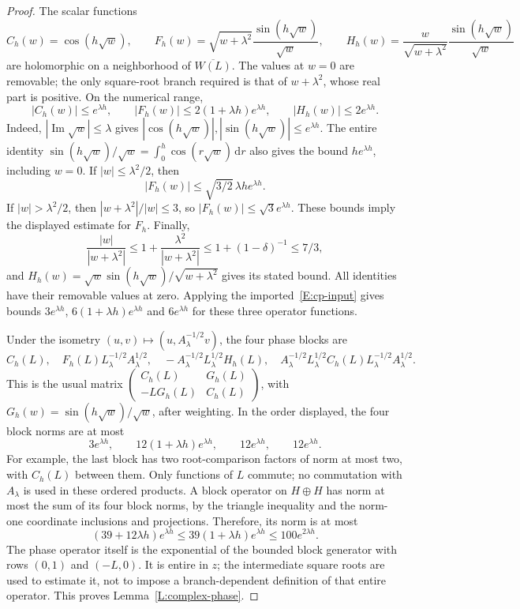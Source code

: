 \documentclass[12pt]{article}
\numberwithin{equation}{section}
\theoremstyle{definition}
\newcommand{\ud}{\,\mathrm{d}}
\begin{document}
\begin{proof}
  The scalar functions
  \[
    C_h(w)=\cos(h\sqrt w),\qquad
    F_h(w)=\sqrt{w+\lambda^2}\frac{\sin(h\sqrt w)}{\sqrt w},\qquad
    H_h(w)=\frac{w}{\sqrt{w+\lambda^2}}
    \frac{\sin(h\sqrt w)}{\sqrt w}
  \]
  are holomorphic on a neighborhood of $\overline{W(L)}$.
  The values at $w=0$ are removable; the only square-root branch
  required is that of $w+\lambda^2$, whose real part is positive.
  On the numerical range,
  \[
    |C_h(w)|\le e^{\lambda h},\qquad
    |F_h(w)|\le2(1+\lambda h)e^{\lambda h},\qquad
    |H_h(w)|\le2e^{\lambda h}.
  \]
  Indeed, $|\operatorname{Im}\sqrt w|\le\lambda$ gives
  $|\cos(h\sqrt w)|,|\sin(h\sqrt w)|\le e^{\lambda h}$.
  The entire identity
  $\sin(h\sqrt w)/\sqrt w=\int_0^h\cos(r\sqrt w)\ud r$
  also gives the bound $he^{\lambda h}$, including $w=0$.
  If $|w|\le\lambda^2/2$, then
  \[
    |F_h(w)|\le\sqrt{3/2}\,\lambda h e^{\lambda h}.
  \]
  If $|w|>\lambda^2/2$, then
  $|w+\lambda^2|/|w|\le3$, so
  $|F_h(w)|\le\sqrt3 e^{\lambda h}$.
  These bounds imply the displayed estimate for $F_h$.
  Finally,
  \[
    \frac{|w|}{|w+\lambda^2|}
    \le1+\frac{\lambda^2}{|w+\lambda^2|}
    \le1+(1-\delta)^{-1}\le7/3,
  \]
  and $H_h(w)=\sqrt w\sin(h\sqrt w)/\sqrt{w+\lambda^2}$ gives
  its stated bound. All identities have their removable values at zero.
  Applying the imported~\eqref{E:cp-input} gives bounds
  $3e^{\lambda h}$, $6(1+\lambda h)e^{\lambda h}$ and
  $6e^{\lambda h}$ for these three operator functions.

  Under the isometry $(u,v)\mapsto(u,A_\lambda^{-1/2}v)$,
  the four phase blocks are
  \[
    C_h(L),\quad
    F_h(L)L_\lambda^{-1/2}A_\lambda^{1/2},\quad
    -A_\lambda^{-1/2}L_\lambda^{1/2}H_h(L),\quad
    A_\lambda^{-1/2}L_\lambda^{1/2}C_h(L)
    L_\lambda^{-1/2}A_\lambda^{1/2}.
  \]
  This is the usual matrix
  $\left(\begin{smallmatrix}C_h(L)&G_h(L)\\-LG_h(L)&C_h(L)\end{smallmatrix}\right)$,
  with $G_h(w)=\sin(h\sqrt w)/\sqrt w$, after weighting.
  In the order displayed, the four block norms are at most
  \[
    3e^{\lambda h},\qquad
    12(1+\lambda h)e^{\lambda h},\qquad
    12e^{\lambda h},\qquad12e^{\lambda h}.
  \]
  For example, the last block has two root-comparison factors of norm
  at most two, with $C_h(L)$ between them. Only functions of $L$ commute;
  no commutation with $A_\lambda$ is used in these ordered products.
  A block operator on $H\oplus H$ has norm at most the sum of its four
  block norms, by the triangle inequality and the norm-one coordinate
  inclusions and projections. Therefore, its norm is at most
  \[
    (39+12\lambda h)e^{\lambda h}
    \le39(1+\lambda h)e^{\lambda h}\le100e^{2\lambda h}.
  \]
  The phase operator itself is the exponential of the bounded block
  generator with rows $(0,1)$ and $(-L,0)$. It is entire in $z$;
  the intermediate square roots are used to estimate it, not to impose
  a branch-dependent definition of that entire operator.
  This proves Lemma~\ref{L:complex-phase}.
\end{proof}
\end{document}
